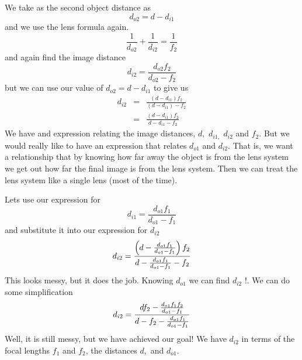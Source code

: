 \documentclass{article}
\begin{document}
We take as the second object distance as 
\[
d_{o2}=d-d_{i1}
\]%
and we use the lens formula again.%
\[
\frac{1}{d_{o2}}+\frac{1}{d_{i2}}=\frac{1}{f_{2}}
\]%
and again find the image distance%
\[
d_{i2}=\frac{d_{o2}f_{2}}{d_{o2}-f_{2}}
\]%
but we can use our value of $d_{o2}=d-d_{i1}$ to give us%
\begin{eqnarray*}
d_{i2} &=&\frac{\left( d-d_{i1}\right) f_{2}}{\left( d-d_{i1}\right) -f_{2}}
\\
&=&\frac{\left( d-d_{i1}\right) f_{2}}{d-d_{i1}-f_{2}}
\end{eqnarray*}%
We have and expression relating the image distances, $d,$ $d_{i1,}$ $d_{i2}$
and $f_{2}.$ But we would really like to have an expression that relates $%
d_{o1}$ and $d_{i2}.$ That is, we want a relationship that by knowing how
far away the object is from the lens system we get out how far the final
image is from the lens system. Then we can treat the lens system like a
single lens (most of the time).

Lets use our expression for 
\[
d_{i1}=\frac{d_{o1}f_{1}}{d_{o1}-f_{1}}
\]%
and substitute it into our expression for $d_{i2}$%
\[
d_{i2}=\frac{\left( d-\frac{d_{o1}f_{1}}{d_{o1}-f_{1}}\right) f_{2}}{d-\frac{%
d_{o1}f_{1}}{d_{o1}-f_{1}}-f_{2}}
\]%
This looks messy, but it does the job. Knowing $d_{o1}$ we can find $d_{i2}$%
!. We can do some simplification%
\begin{equation}
d_{i2}=\frac{df_{2}-\frac{d_{o1}f_{1}f_{2}}{d_{o1}-f_{1}}}{d-f_{2}-\frac{%
d_{o1}f_{1}}{d_{o1}-f_{1}}}  \label{TwoLensesSeparated}
\end{equation}%
Well, it is still messy, but we have achieved our goal! We have $d_{i2}$ in
terms of the focal lengths $f_{1}$ and $f_{2}$, the distances $d,$ and $%
d_{o1}.$
\end{document}

